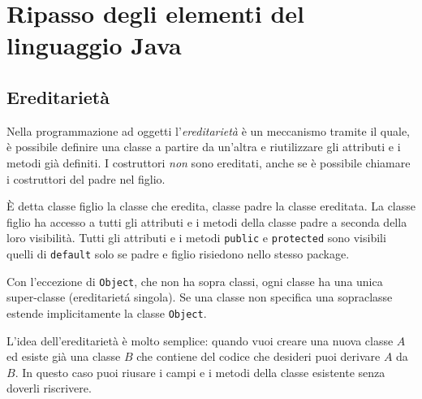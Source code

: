 \documentclass{article}
\author{\textbf{\hmwkAuthorName}}
\date{} %
\begin{document}
\maketitle



\newpage
\tableofcontents
\newpage

\theoremstyle{definition} 

\newtheorem{mydef}{Definition}
\newtheorem{lemma}{Lemma}

\newtheorem{theorem}{Theorem}[section]

\section{Ripasso degli elementi del linguaggio Java}
\subsection{Ereditarietà}

Nella programmazione ad oggetti l'\emph{ereditarietà} è un meccanismo tramite il quale,
è possibile definire una classe a partire da un'altra e riutilizzare gli attributi e i metodi
già definiti. I costruttori \emph{non} sono ereditati, anche se \`e possibile chiamare i costruttori del padre nel figlio.

È detta classe figlio la classe che eredita, classe padre la classe ereditata.
La classe figlio ha accesso a tutti gli attributi e i metodi della classe padre a seconda della loro visibilit\`a. Tutti gli attributi e i metodi \texttt{public} e \texttt{protected} sono visibili quelli di \texttt{default} solo se padre e figlio risiedono nello stesso package.

Con l'eccezione di  \texttt{Object}, che non ha sopra classi, ogni classe ha una unica super-classe (ereditariet\'a singola). Se una classe non specifica una sopraclasse estende implicitamente la classe \texttt{Object}.

L'idea dell'ereditariet\`a \`e molto semplice: quando vuoi creare una nuova classe $A$ ed esiste gi\`a una classe $B$ che contiene del codice che desideri puoi derivare $A$ da $B$. In questo caso puoi riusare i campi e i metodi della classe esistente senza doverli riscrivere.
\end{document}
